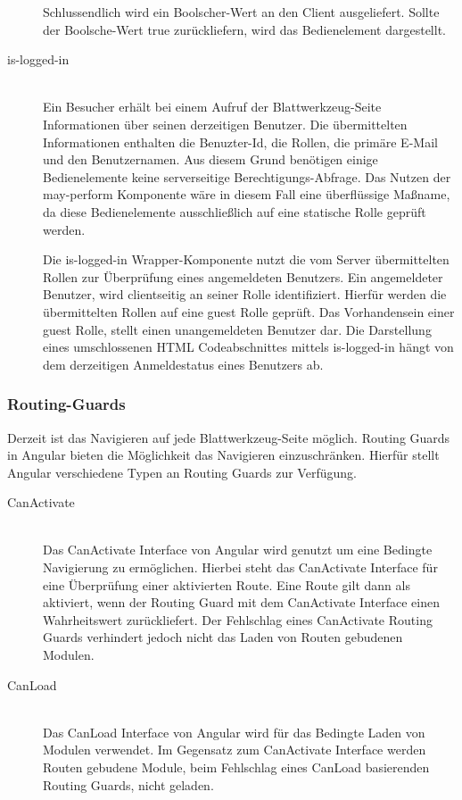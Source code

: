\begin{description}
	\begin{minipage}{\linewidth}
		
	\end{minipage}

	Schlussendlich wird ein Boolscher-Wert an den Client ausgeliefert. Sollte der Boolsche-Wert true zurückliefern, wird das Bedienelement dargestellt.
	
	\item[is-logged-in]\hfill\\
	Ein Besucher erhält  bei einem Aufruf der Blattwerkzeug-Seite Informationen über seinen derzeitigen Benutzer. Die übermittelten Informationen enthalten die Benuzter-Id, die Rollen, die primäre E-Mail und den Benutzernamen. Aus diesem Grund benötigen einige Bedienelemente keine serverseitige Berechtigungs-Abfrage. Das Nutzen  der may-perform Komponente wäre in diesem Fall eine überflüssige Maßname, da diese Bedienelemente ausschließlich auf eine statische Rolle geprüft werden.
	
	Die is-logged-in Wrapper-Komponente nutzt die vom Server übermittelten Rollen zur Überprüfung eines angemeldeten Benutzers. Ein angemeldeter Benutzer, wird clientseitig an seiner Rolle identifiziert. Hierfür werden die übermittelten Rollen auf eine guest Rolle geprüft. Das Vorhandensein einer guest Rolle, stellt einen unangemeldeten Benutzer dar. Die Darstellung eines umschlossenen HTML Codeabschnittes mittels is-logged-in hängt von dem derzeitigen Anmeldestatus eines Benutzers ab.  
\end{description}

\subsubsection{Routing-Guards}
\label{sec:routing-guards}
Derzeit ist das Navigieren auf jede Blattwerkzeug-Seite möglich. Routing Guards in Angular bieten die Möglichkeit das Navigieren einzuschränken. Hierfür stellt Angular verschiedene Typen an Routing Guards zur Verfügung. 

\begin{description}
	\item[CanActivate]\hfill\\
	Das CanActivate Interface von Angular wird genutzt um eine Bedingte Navigierung zu ermöglichen. Hierbei steht das CanActivate Interface für eine Überprüfung einer aktivierten Route. Eine Route gilt dann als aktiviert, wenn der Routing Guard mit dem CanActivate Interface einen Wahrheitswert zurückliefert. Der Fehlschlag eines CanActivate Routing Guards verhindert jedoch nicht das Laden von Routen gebudenen Modulen.
	\item[CanLoad]\hfill\\
	Das CanLoad Interface von Angular wird für das Bedingte Laden von Modulen verwendet. Im Gegensatz zum CanActivate Interface werden Routen gebudene Module, beim Fehlschlag eines CanLoad basierenden Routing Guards, nicht geladen.
\end{description}

